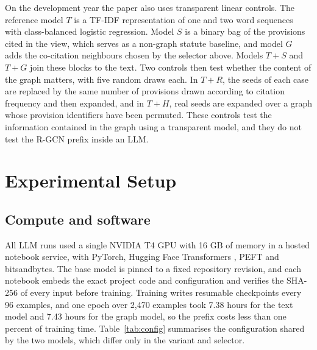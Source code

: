 \documentclass[journal]{IEEEtran}
\begin{document}
On the development year the paper also uses transparent linear controls. The reference model $T$ is a TF-IDF representation of one and two word sequences with class-balanced logistic regression. Model $S$ is a binary bag of the provisions cited in the view, which serves as a non-graph statute baseline, and model $G$ adds the co-citation neighbours chosen by the selector above. Models $T{+}S$ and $T{+}G$ join these blocks to the text. Two controls then test whether the content of the graph matters, with five random draws each. In $T{+}R$, the seeds of each case are replaced by the same number of provisions drawn according to citation frequency and then expanded, and in $T{+}H$, real seeds are expanded over a graph whose provision identifiers have been permuted. These controls test the information contained in the graph using a transparent model, and they do not test the R-GCN prefix inside an LLM.

\section{Experimental Setup}\label{sec:setup}
\subsection{Compute and software}
All LLM runs used a single NVIDIA T4 GPU with 16 GB of memory in a hosted notebook service, with PyTorch, Hugging Face Transformers \cite{r64}, PEFT and bitsandbytes. The base model is pinned to a fixed repository revision, and each notebook embeds the exact project code and configuration and verifies the SHA-256 of every input before training. Training writes resumable checkpoints every 96 examples, and one epoch over 2,470 examples took 7.38 hours for the text model and 7.43 hours for the graph model, so the prefix costs less than one percent of training time. Table~\ref{tab:config} summarises the configuration shared by the two models, which differ only in the variant and selector.
\end{document}
